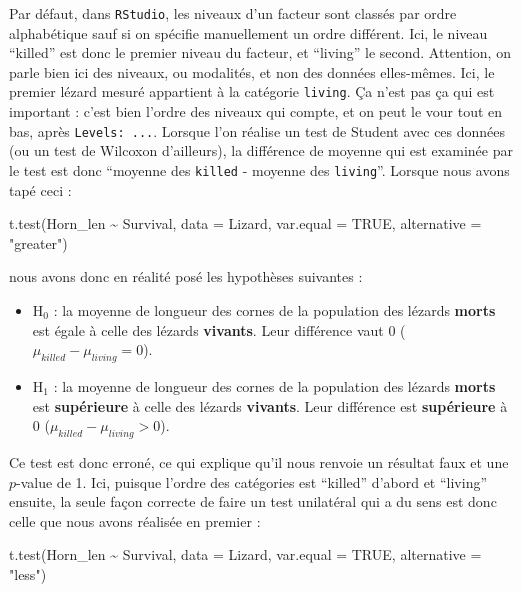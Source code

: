 \documentclass[
  a4paper,
  DIV=11,
  numbers=noendperiod,
  oneside]{scrreprt}
\newenvironment{Shaded}{}{}
\newcommand{\AttributeTok}[1]{\textcolor[rgb]{0.84,0.23,0.29}{#1}}
\newcommand{\ConstantTok}[1]{\textcolor[rgb]{0.00,0.36,0.77}{#1}}
\newcommand{\FunctionTok}[1]{\textcolor[rgb]{0.44,0.26,0.76}{#1}}
\newcommand{\NormalTok}[1]{\textcolor[rgb]{0.14,0.16,0.18}{#1}}
\newcommand{\SpecialCharTok}[1]{\textcolor[rgb]{0.00,0.36,0.77}{#1}}
\newcommand{\StringTok}[1]{\textcolor[rgb]{0.01,0.18,0.38}{#1}}
\providecommand{\tightlist}{%
  \setlength{\itemsep}{0pt}\setlength{\parskip}{0pt}}\usepackage{longtable,booktabs,array}
\begin{document}
Par défaut, dans \texttt{RStudio}, les niveaux d'un facteur sont classés
par ordre alphabétique sauf si on spécifie manuellement un ordre
différent. Ici, le niveau ``killed'' est donc le premier niveau du
facteur, et ``living'' le second. Attention, on parle bien ici des
niveaux, ou modalités, et non des données elles-mêmes. Ici, le premier
lézard mesuré appartient à la catégorie \texttt{living}. Ça n'est pas ça
qui est important : c'est bien l'ordre des niveaux qui compte, et on
peut le vour tout en bas, après \texttt{Levels:\ ...}. Lorsque l'on
réalise un test de Student avec ces données (ou un test de Wilcoxon
d'ailleurs), la différence de moyenne qui est examinée par le test est
donc ``moyenne des \texttt{killed} - moyenne des \texttt{living}''.
Lorsque nous avons tapé ceci :

\begin{Shaded}
\begin{Highlighting}[]
\FunctionTok{t.test}\NormalTok{(Horn\_len }\SpecialCharTok{\textasciitilde{}}\NormalTok{ Survival, }\AttributeTok{data =}\NormalTok{ Lizard, }\AttributeTok{var.equal =} \ConstantTok{TRUE}\NormalTok{,}
       \AttributeTok{alternative =} \StringTok{"greater"}\NormalTok{)}
\end{Highlighting}
\end{Shaded}

nous avons donc en réalité posé les hypothèses suivantes :

\begin{itemize}
\tightlist
\item
  H\(_0\) : la moyenne de longueur des cornes de la population des
  lézards \textbf{morts} est égale à celle des lézards \textbf{vivants}.
  Leur différence vaut 0 (\(\mu_{killed}-\mu_{living} = 0\)).
\item
  H\(_1\) : la moyenne de longueur des cornes de la population des
  lézards \textbf{morts} est \textbf{supérieure} à celle des lézards
  \textbf{vivants}. Leur différence est \textbf{supérieure} à 0
  (\(\mu_{killed}-\mu_{living} > 0\)).
\end{itemize}

Ce test est donc erroné, ce qui explique qu'il nous renvoie un résultat
faux et une \(p\)-value de 1. Ici, puisque l'ordre des catégories est
``killed'' d'abord et ``living'' ensuite, la seule façon correcte de
faire un test unilatéral qui a du sens est donc celle que nous avons
réalisée en premier :

\begin{Shaded}
\begin{Highlighting}[]
\FunctionTok{t.test}\NormalTok{(Horn\_len }\SpecialCharTok{\textasciitilde{}}\NormalTok{ Survival, }\AttributeTok{data =}\NormalTok{ Lizard, }\AttributeTok{var.equal =} \ConstantTok{TRUE}\NormalTok{,}
       \AttributeTok{alternative =} \StringTok{"less"}\NormalTok{)}
\end{Highlighting}
\end{Shaded}
\end{document}
